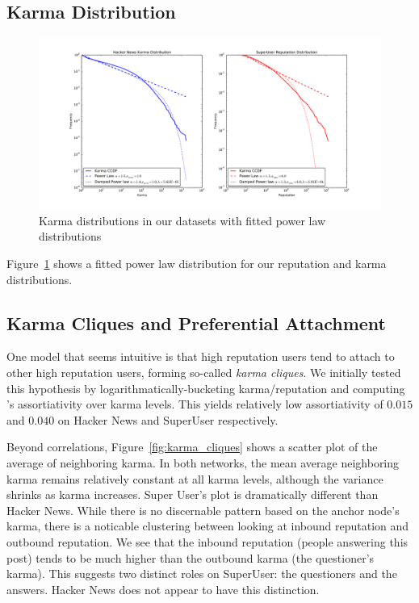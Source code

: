 \documentclass[11pt]{article}
\begin{document}
\subsection{Karma Distribution}
\begin{figure}[t]
\centering
\includegraphics[width=0.95\linewidth]{powerlaws}
\caption{Karma distributions in our datasets with fitted power law distributions}
\label{fig:powerlaws}
\end{figure}

Figure~\ref{fig:powerlaws} shows a fitted power law distribution for our
reputation and karma distributions.

\subsection{Karma Cliques and Preferential Attachment}
\label{sec:karma_cliques}
One model that seems intuitive is that high reputation users
tend to attach to other high reputation users, forming so-called
\textit{karma cliques}. We initially tested this hypothesis by
logarithmatically-bucketing karma/reputation and computing 
\citet{newman2003mixing}'s assortiativity over karma levels. This yields
relatively low assortiativity of $0.015$ and $0.040$ on Hacker News
and SuperUser respectively. 

Beyond correlations, Figure~\ref{fig:karma_cliques}
shows a scatter plot of the average of neighboring karma. In both networks,
the mean average neighboring karma remains relatively constant at all
karma levels, although the variance shrinks as karma increases.
Super User's plot is dramatically different than Hacker News. While there is
no discernable pattern based on the anchor node's karma, there is a noticable
clustering between looking at inbound reputation and outbound reputation. We see
that the inbound reputation (people answering this post) tends to be much higher
than the outbound karma (the questioner's karma). This suggests two distinct
roles on SuperUser: the questioners and the answers. Hacker News does not
appear to have this distinction.
\end{document}
